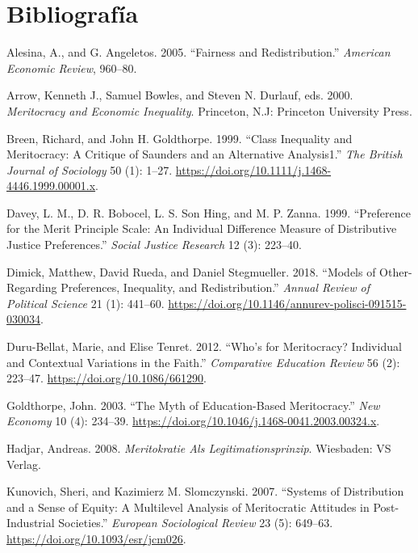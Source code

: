 \documentclass[
]{article}
\begin{document}
\hypertarget{bibliografuxeda}{%
\section*{Bibliografía}\label{bibliografuxeda}}

\hypertarget{refs}{}
\leavevmode\hypertarget{ref-alesina_Fairness_2005}{}%
Alesina, A., and G. Angeletos. 2005. ``Fairness and Redistribution.''
\emph{American Economic Review}, 960--80.

\leavevmode\hypertarget{ref-arrow_meritocracy_2000}{}%
Arrow, Kenneth J., Samuel Bowles, and Steven N. Durlauf, eds. 2000.
\emph{Meritocracy and Economic Inequality}. Princeton, N.J: Princeton
University Press.

\leavevmode\hypertarget{ref-breenClassInequalityMeritocracy1999}{}%
Breen, Richard, and John H. Goldthorpe. 1999. ``Class Inequality and
Meritocracy: A Critique of Saunders and an Alternative Analysis1.''
\emph{The British Journal of Sociology} 50 (1): 1--27.
\url{https://doi.org/10.1111/j.1468-4446.1999.00001.x}.

\leavevmode\hypertarget{ref-davey_preference_1999}{}%
Davey, L. M., D. R. Bobocel, L. S. Son Hing, and M. P. Zanna. 1999.
``Preference for the Merit Principle Scale: An Individual Difference
Measure of Distributive Justice Preferences.'' \emph{Social Justice
Research} 12 (3): 223--40.

\leavevmode\hypertarget{ref-dimick_Models_2018}{}%
Dimick, Matthew, David Rueda, and Daniel Stegmueller. 2018. ``Models of
Other-Regarding Preferences, Inequality, and Redistribution.''
\emph{Annual Review of Political Science} 21 (1): 441--60.
\url{https://doi.org/10.1146/annurev-polisci-091515-030034}.

\leavevmode\hypertarget{ref-duru-bellat_whos_2012}{}%
Duru-Bellat, Marie, and Elise Tenret. 2012. ``Who's for Meritocracy?
Individual and Contextual Variations in the Faith.'' \emph{Comparative
Education Review} 56 (2): 223--47. \url{https://doi.org/10.1086/661290}.

\leavevmode\hypertarget{ref-goldthorpe_myth_2003}{}%
Goldthorpe, John. 2003. ``The Myth of Education-Based Meritocracy.''
\emph{New Economy} 10 (4): 234--39.
\url{https://doi.org/10.1046/j.1468-0041.2003.00324.x}.

\leavevmode\hypertarget{ref-hadjar_meritokratie_2008}{}%
Hadjar, Andreas. 2008. \emph{Meritokratie Als Legitimationsprinzip}.
Wiesbaden: VS Verlag.

\leavevmode\hypertarget{ref-kunovich_systems_2007}{}%
Kunovich, Sheri, and Kazimierz M. Slomczynski. 2007. ``Systems of
Distribution and a Sense of Equity: A Multilevel Analysis of
Meritocratic Attitudes in Post-Industrial Societies.'' \emph{European
Sociological Review} 23 (5): 649--63.
\url{https://doi.org/10.1093/esr/jcm026}.
\end{document}
